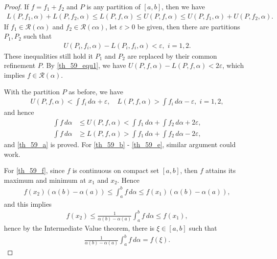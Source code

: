 \documentclass[11pt]{book}
\theoremstyle{definition}
\numberwithin{equation}{chapter}
\begin{document}
\begin{proof}
If $f = f_1 + f_2$ and $P$ is any partition of $[a,b]$, then we have
\begin{align}\label{th_59_equ1}
    L(P,f_1,\alpha) + L(P,f_2,\alpha) \leq L(P,f,\alpha) \leq U(P,f,\alpha) \leq U(P,f_1,\alpha) + U(P,f_2,\alpha).
\end{align}
If $f_1 \in \mathscr{R}(c\alpha)$ and $f_2 \in \mathscr{R}(c\alpha)$, let $\varepsilon > 0$ be given, then there are partitions $P_1, P_2$ such that
\begin{align*}
    U(P_i,f_i,\alpha) - L(P_i,f_i,\alpha) < \varepsilon, \,\, i = 1,2.
\end{align*}
These inequalities still hold it $P_1$ and $P_2$ are replaced by their common refinement $P$. By \eqref{th_59_equ1}, we have $U(P,f,\alpha) - L(P,f,\alpha) < 2\varepsilon$, which implies $f \in \mathscr{R}(\alpha)$.

With the partition $P$ as before, we have
\begin{align*}
    U(P,f,\alpha) < \int f_i \,d\alpha + \varepsilon, \quad L(P,f,\alpha) >  \int f_i \,d\alpha - \varepsilon, \,\, i = 1,2,
\end{align*}
and hence
\begin{align*}
    \int f \,d\alpha & \leq U(P,f,\alpha) < \int f_1 \,d\alpha + \int f_2 \,d\alpha + 2 \varepsilon, \\
    \int f \,d\alpha & \geq L(P,f,\alpha) > \int f_1 \,d\alpha + \int f_2 \,d\alpha - 2 \varepsilon,
\end{align*}
and \ref{th_59_a} is proved. For \ref{th_59_b} - \ref{th_59_e}, similar argument could work.

For \ref{th_59_f}, since $f$ is continuous on compact set $[a,b]$, then $f$ attains its maximum and minimum at $x_1$ and $x_2$. Hence
\begin{align*}
    f(x_2) (\alpha(b) - \alpha(a)) \leq \int^b_a f \,d\alpha \leq f(x_1) (\alpha(b) - \alpha(a)),
\end{align*}
and this implies
\begin{align*}
    f(x_2) \leq \frac{1}{\alpha(b) - \alpha(a)} \int^b_a f \,d\alpha \leq f(x_1),
\end{align*}
hence by the Intermediate Value theorem, there is $\xi \in [a,b]$ such that
\begin{align*}
    \frac{1}{\alpha(b) - \alpha(a)} \int^b_a f \,d\alpha = f(\xi).
\end{align*}
\end{proof}
\end{document}

